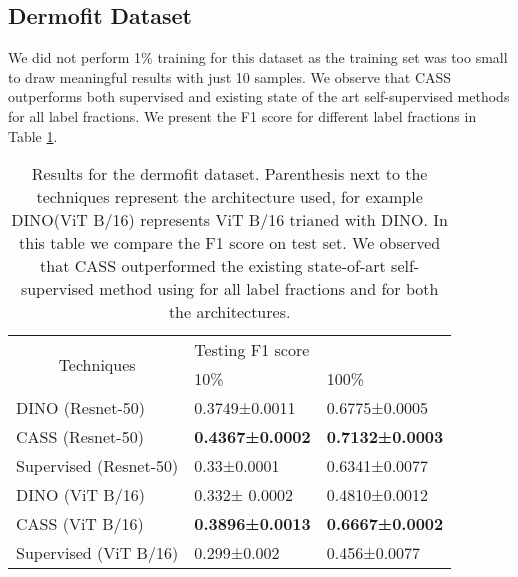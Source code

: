 \subsection{Dermofit Dataset}
We did not perform 1\% training for this dataset as the training set was too small to draw meaningful results with just 10 samples. We observe that CASS outperforms both supervised and existing state of the art self-supervised methods for all label fractions. We present the F1 score for different label fractions in Table \ref{dermofitperformance}. 
\begin{table}[!htb]
\centering
\begin{tabular}{lll}

\hline
\multicolumn{1}{c}{\multirow{2}{*}{Techniques}} & \multicolumn{2}{l}{Testing F1 score} \\
\multicolumn{1}{c}{}                                         & 10\%       & 100\%         \\
\hline

DINO                                             (Resnet-50)                                     &0.3749±0.0011          &0.6775±0.0005           \\
CASS                                            (Resnet-50)                                     & \textbf{0.4367±0.0002}      & \textbf{0.7132±0.0003}           \\
Supervised                                       (Resnet-50)                                   & 0.33±0.0001           &  0.6341±0.0077           \\
\hline

DINO                        (ViT B/16)                             &0.332± 0.0002             &0.4810±0.0012            \\
CASS    (ViT B/16)                                  & \textbf{0.3896±0.0013}           & \textbf{0.6667±0.0002}            \\
Supervised         (ViT B/16)                               &0.299±0.002          &0.456±0.0077          \\
\hline
\end{tabular}
\caption{Results for the dermofit dataset. Parenthesis next to the techniques represent the architecture used, for example DINO(ViT B/16) represents ViT B/16 trianed with DINO. In this table we compare the F1 score on test set. We observed that CASS outperformed the existing state-of-art self-supervised method using for all label fractions and for both the architectures.}
\label{dermofitperformance}
\end{table}


